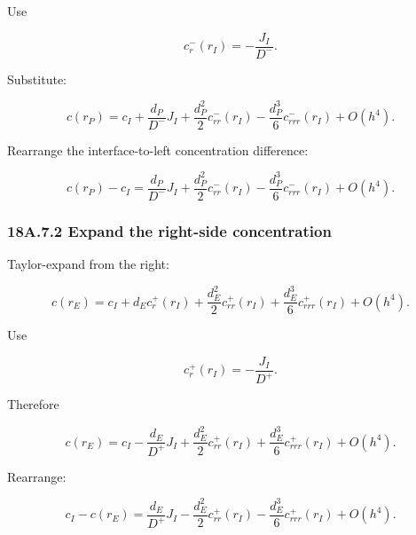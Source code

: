 \documentclass[11pt,a4paper]{article}
\begin{document}
Use

\begin{equation}
c_r^-(r_I)
=
-\frac{J_I}{D^-}.
\tag{TRISO-ACC-178}
\label{eq:triso-acc-178}
\end{equation}

Substitute:

\begin{equation}
c(r_P)
=
c_I
+
\frac{d_P}{D^-}J_I
+
\frac{d_P^2}{2}c_{rr}^-(r_I)
-
\frac{d_P^3}{6}c_{rrr}^-(r_I)
+
O(h^4).
\tag{TRISO-ACC-179}
\label{eq:triso-acc-179}
\end{equation}

Rearrange the interface-to-left concentration difference:

\begin{equation}
c(r_P)-c_I
=
\frac{d_P}{D^-}J_I
+
\frac{d_P^2}{2}c_{rr}^-(r_I)
-
\frac{d_P^3}{6}c_{rrr}^-(r_I)
+
O(h^4).
\tag{TRISO-ACC-180}
\label{eq:triso-acc-180}
\end{equation}

\subsubsection*{18A.7.2 Expand the right-side concentration}

Taylor-expand from the right:

\begin{equation}
c(r_E)
=
c_I
+
d_Ec_r^+(r_I)
+
\frac{d_E^2}{2}c_{rr}^+(r_I)
+
\frac{d_E^3}{6}c_{rrr}^+(r_I)
+
O(h^4).
\tag{TRISO-ACC-181}
\label{eq:triso-acc-181}
\end{equation}

Use

\begin{equation}
c_r^+(r_I)
=
-\frac{J_I}{D^+}.
\tag{TRISO-ACC-182}
\label{eq:triso-acc-182}
\end{equation}

Therefore

\begin{equation}
c(r_E)
=
c_I
-
\frac{d_E}{D^+}J_I
+
\frac{d_E^2}{2}c_{rr}^+(r_I)
+
\frac{d_E^3}{6}c_{rrr}^+(r_I)
+
O(h^4).
\tag{TRISO-ACC-183}
\label{eq:triso-acc-183}
\end{equation}

Rearrange:

\begin{equation}
c_I-c(r_E)
=
\frac{d_E}{D^+}J_I
-
\frac{d_E^2}{2}c_{rr}^+(r_I)
-
\frac{d_E^3}{6}c_{rrr}^+(r_I)
+
O(h^4).
\tag{TRISO-ACC-184}
\label{eq:triso-acc-184}
\end{equation}
\end{document}
